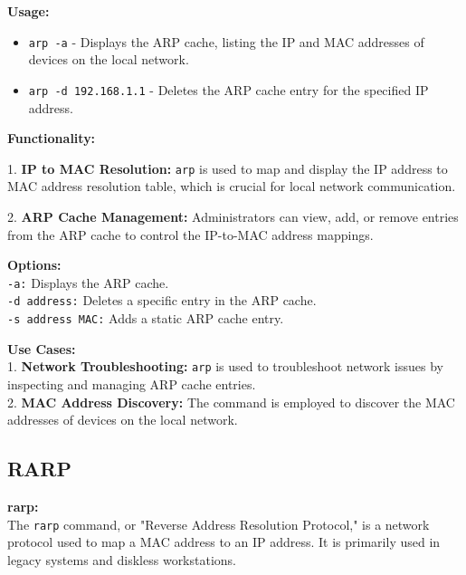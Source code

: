 \documentclass[11pt]{report}
\begin{document}
\vspace{\baselineskip}

\textbf{Usage:}
\begin{itemize}
    \item \texttt{arp -a} - Displays the ARP cache, listing the IP and MAC addresses of devices on the local network.
    \item \texttt{arp -d 192.168.1.1} - Deletes the ARP cache entry for the specified IP address.
\end{itemize}

\vspace{\baselineskip}

\textbf{Functionality:}

1. \textbf{IP to MAC Resolution:} \texttt{arp} is used to map and display the IP address to MAC address resolution table, which is crucial for local network communication.

2. \textbf{ARP Cache Management:} Administrators can view, add, or remove entries from the ARP cache to control the IP-to-MAC address mappings.

\vspace{\baselineskip}

\textbf{Options:} \\
\texttt{-a:} Displays the ARP cache.\\
\texttt{-d address:} Deletes a specific entry in the ARP cache.\\
\texttt{-s address MAC:} Adds a static ARP cache entry.

\vspace{\baselineskip}

\textbf{Use Cases:} \\
1. \textbf{Network Troubleshooting:} \texttt{arp} is used to troubleshoot network issues by inspecting and managing ARP cache entries.\\
2. \textbf{MAC Address Discovery:} The command is employed to discover the MAC addresses of devices on the local network.

\vspace{\baselineskip}

\subsection{RARP}
\textbf{rarp:} \\
The \texttt{rarp} command, or "Reverse Address Resolution Protocol," is a network protocol used to map a MAC address to an IP address. It is primarily used in legacy systems and diskless workstations.
\end{document}
